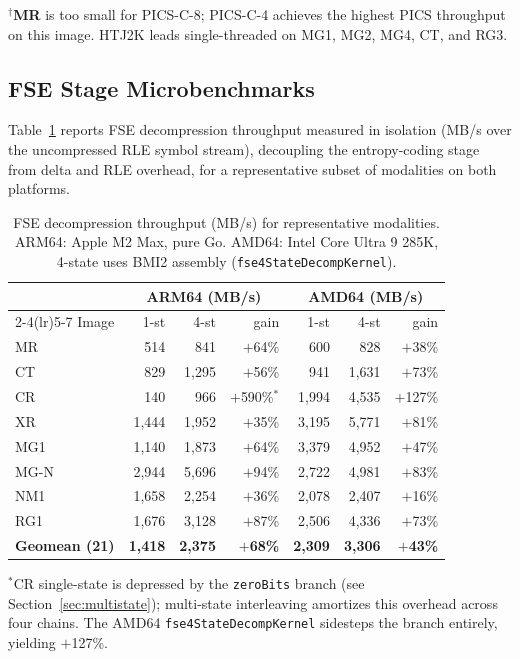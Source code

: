 \documentclass[journal]{IEEEtran}
\begin{document}
$^\dagger$\textbf{MR} is too small for PICS-C-8; PICS-C-4 achieves the highest
PICS throughput on this image. HTJ2K leads single-threaded on MG1, MG2, MG4,
CT, and RG3.

\subsection{FSE Stage Microbenchmarks}

Table~\ref{tab:fse-combined} reports FSE decompression throughput measured in
isolation (MB/s over the uncompressed RLE symbol stream), decoupling the
entropy-coding stage from delta and RLE overhead, for a representative subset
of modalities on both platforms.

\begin{table}[htbp]
\centering
\caption{FSE decompression throughput (MB/s) for representative
modalities. ARM64: Apple M2 Max, pure Go. AMD64: Intel Core Ultra 9 285K,
4-state uses BMI2 assembly (\texttt{fse4StateDecompKernel}).}
\label{tab:fse-combined}
\scriptsize
\begin{tabular}{lrrrrrr}
\toprule
 & \multicolumn{3}{c}{ARM64 (MB/s)} & \multicolumn{3}{c}{AMD64 (MB/s)} \\
\cmidrule(lr){2-4}\cmidrule(lr){5-7}
Image & 1-st & 4-st & gain & 1-st & 4-st & gain \\
\midrule
MR   &   514 &   841 & $+$64\% &   600 &   828 & $+$38\% \\
CT   &   829 & 1,295 & $+$56\% &   941 & 1,631 & $+$73\% \\
CR   &   140 &   966 & $+$590\%$^*$ & 1,994 & 4,535 & $+$127\% \\
XR   & 1,444 & 1,952 & $+$35\% & 3,195 & 5,771 & $+$81\% \\
MG1  & 1,140 & 1,873 & $+$64\% & 3,379 & 4,952 & $+$47\% \\
MG-N & 2,944 & 5,696 & $+$94\% & 2,722 & 4,981 & $+$83\% \\
NM1  & 1,658 & 2,254 & $+$36\% & 2,078 & 2,407 & $+$16\% \\
RG1  & 1,676 & 3,128 & $+$87\% & 2,506 & 4,336 & $+$73\% \\
\midrule
\textbf{Geomean (21)} & \textbf{1,418} & \textbf{2,375} & \textbf{$+$68\%} &
\textbf{2,309} & \textbf{3,306} & \textbf{$+$43\%} \\
\bottomrule
\end{tabular}
\end{table}

$^*$CR single-state is depressed by the \texttt{zeroBits} branch (see
Section~\ref{sec:multistate}); multi-state interleaving amortizes this
overhead across four chains. The AMD64 \texttt{fse4StateDecompKernel}
sidesteps the branch entirely, yielding $+$127\%.
\end{document}

